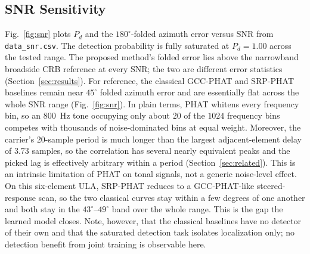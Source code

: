 \documentclass[5p,twocolumn]{elsarticle}
\begin{document}
\subsection{SNR Sensitivity}
Fig.~\ref{fig:snr} plots $P_d$ and the $180^\circ$-folded azimuth error versus SNR from \texttt{data\_snr.csv}. The detection probability is fully saturated at $P_d=1.00$ across the tested range. The proposed method's folded error lies above the narrowband broadside CRB reference at every SNR; the two are different error statistics (Section~\ref{sec:results}). For reference, the classical GCC-PHAT and SRP-PHAT baselines remain near $45^\circ$ folded azimuth error and are essentially flat across the whole SNR range (Fig.~\ref{fig:snr}). In plain terms, PHAT whitens every frequency bin, so an \SI{800}{\hertz} tone occupying only about $20$ of the $1024$ frequency bins competes with thousands of noise-dominated bins at equal weight. Moreover, the carrier's $20$-sample period is much longer than the largest adjacent-element delay of $3.73$ samples, so the correlation has several nearly equivalent peaks and the picked lag is effectively arbitrary within a period (Section~\ref{sec:related}). This is an intrinsic limitation of PHAT on tonal signals, not a generic noise-level effect. On this six-element ULA, SRP-PHAT reduces to a GCC-PHAT-like steered-response scan, so the two classical curves stay within a few degrees of one another and both stay in the $43^\circ$--$49^\circ$ band over the whole range. This is the gap the learned model closes. Note, however, that the classical baselines have no detector of their own and that the saturated detection task isolates localization only; no detection benefit from joint training is observable here.
\end{document}
